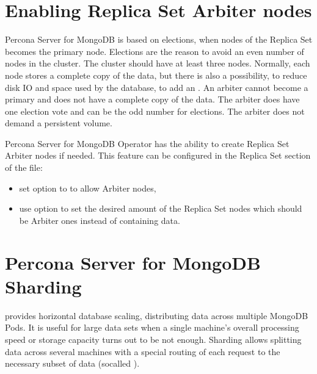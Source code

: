 \documentclass[letterpaper,10pt,english]{sphinxmanual}
\begin{document}
\chapter{Enabling Replica Set Arbiter nodes}
\label{\detokenize{arbiter:enabling-replica-set-arbiter-nodes}}\label{\detokenize{arbiter:arbiter}}\label{\detokenize{arbiter::doc}}
Percona Server for MongoDB 
is based on elections, when nodes of the Replica Set 
becomes the primary node. Elections are the reason to avoid an even
number of nodes in the cluster. The cluster should have
at least three nodes. Normally, each node stores a complete copy of the data,
but there is also a possibility, to reduce disk IO and space used by the
database, to add an . An arbiter cannot become a primary and does not have a complete copy of the data. The arbiter does have one election vote and can be the odd number for elections. The arbiter does not demand a persistent volume.

Percona Server for MongoDB Operator has the ability to create Replica Set Arbiter
nodes if needed. This feature can be configured in the Replica Set
section of the
file:
\begin{itemize}
\item {} 
set  option to  to allow Arbiter nodes,

\item {} 
use  option to set the desired amount of the Replica
Set nodes which should be Arbiter ones instead of containing data.

\end{itemize}


\chapter{Percona Server for MongoDB Sharding}
\label{\detokenize{sharding:percona-server-for-mongodb-sharding}}\label{\detokenize{sharding:operator-sharding}}\label{\detokenize{sharding::doc}}
provides horizontal database scaling, distributing data across multiple MongoDB
Pods. It is useful for large data sets when a single machine’s overall
processing speed or storage capacity turns out to be not enough.
Sharding allows splitting data across several machines with a special routing
of each request to the necessary subset of data (so\sphinxhyphen{}called ).
\end{document}
